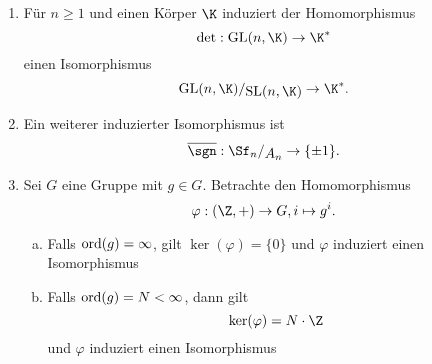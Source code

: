 \begin{beispiele}
\begin{enumerate}
\item Für $n \geq 1$ und einen Körper $\K$ induziert der Homomorphismus
\begin{equation}
\det: \text{GL}(n,\K) \to \K^\ast
\end{equation}
einen Isomorphismus
\begin{equation}
\quotient{\text{GL}(n,\K)}{\text{SL}(n, \K)} \to \K^\ast.
\end{equation}
\item Ein weiterer induzierter Isomorphismus ist
\begin{equation}
\overline{\sgn}: \quotient{\Sf_n}{A_n} \to \{\pm 1\}.
\end{equation}
\item Sei $G$ eine Gruppe mit $g \in G$. Betrachte den Homomorphismus
\begin{equation}
\varphi: (\Z, +) \to G, i \mapsto g^i.
\end{equation}
\begin{enumerate}[(a)]
\item Falls $\operatorname{\text{ord}} (g) = \infty$, gilt $\ker (\varphi) = \{0\}$ und $\varphi$ induziert einen Isomorphismus
\begin{center}
\end{center}
\item Falls $\operatorname{\text{ord}} (g) =N < \infty$, dann gilt
\begin{equation}
\ker (\varphi) = N \cdot \Z
\end{equation}
und $\varphi$ induziert einen Isomorphismus
\begin{center}
\end{center}
\end{enumerate}
\end{enumerate}
\end{beispiele}

